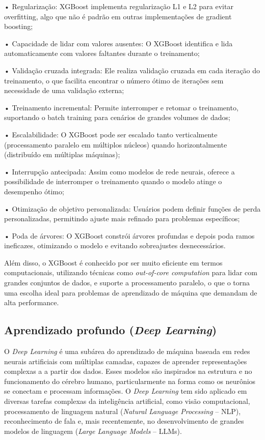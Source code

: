 • Regularização: XGBoost implementa regularização L1 e L2 para evitar overfitting, algo
que não é padrão em outras implementações de gradient boosting;

• Capacidade de lidar com valores ausentes: O XGBoost identifica e lida
automaticamente com valores faltantes durante o treinamento;

• Validação cruzada integrada: Ele realiza validação cruzada em cada iteração do
treinamento, o que facilita encontrar o número ótimo de iterações sem necessidade de
uma validação externa;

• Treinamento incremental: Permite interromper e retomar o treinamento, suportando o
batch training para cenários de grandes volumes de dados;

• Escalabilidade: O XGBoost pode ser escalado tanto verticalmente (processamento
paralelo em múltiplos núcleos) quando horizontalmente (distribuído em múltiplas
máquinas);

• Interrupção antecipada: Assim como modelos de rede neurais, oferece a possibilidade
de interromper o treinamento quando o modelo atinge o desempenho ótimo;

• Otimização de objetivo personalizada: Usuários podem definir funções de perda
personalizadas, permitindo ajuste mais refinado para problemas específicos;

• Poda de árvores: O XGBoost constrói árvores profundas e depois poda ramos ineficazes,
otimizando o modelo e evitando sobreajustes desnecessários.

Além disso, o XGBoost é conhecido por ser muito eficiente em termos computacionais,
utilizando técnicas como \textit{out-of-core computation} \cite{schiara2023detailed} para lidar com grandes conjuntos de
dados, e suporte a processamento paralelo, o que o torna uma escolha ideal para problemas
de aprendizado de máquina que demandam de alta performance.

\subsection{Aprendizado profundo (\textit{Deep Learning})}
O \textit{Deep Learning} é uma subárea do aprendizado de máquina baseada em redes
neurais artificiais com múltiplas camadas, capazes de aprender representações complexas a a
partir dos dados. Esses modelos são inspirados na estrutura e no funcionamento do cérebro
humano, particularmente na forma como os neurônios se conectam e processam informações.
O \textit{Deep Learning} tem sido aplicado em diversas tarefas complexas da inteligência artificial, como
visão computacional, processamento de linguagem natural (\textit{Natural Language Processing} –
NLP), reconhecimento de fala e, mais recentemente, no desenvolvimento de grandes modelos
de linguagem (\textit{Large Language Models} – LLMs).

